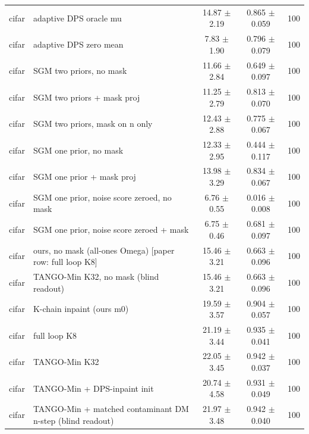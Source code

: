 \begin{tabular}{llccc}
cifar & adaptive DPS oracle mu & 14.87 $\pm$ 2.19 & 0.865 $\pm$ 0.059 & 100\\
cifar & adaptive DPS zero mean & 7.83 $\pm$ 1.90 & 0.796 $\pm$ 0.079 & 100\\
cifar & SGM two priors, no mask & 11.66 $\pm$ 2.84 & 0.649 $\pm$ 0.097 & 100\\
cifar & SGM two priors + mask proj & 11.25 $\pm$ 2.79 & 0.813 $\pm$ 0.070 & 100\\
cifar & SGM two priors, mask on n only & 12.43 $\pm$ 2.88 & 0.775 $\pm$ 0.067 & 100\\
cifar & SGM one prior, no mask & 12.33 $\pm$ 2.95 & 0.444 $\pm$ 0.117 & 100\\
cifar & SGM one prior + mask proj & 13.98 $\pm$ 3.29 & 0.834 $\pm$ 0.067 & 100\\
cifar & SGM one prior, noise score zeroed, no mask & 6.76 $\pm$ 0.55 & 0.016 $\pm$ 0.008 & 100\\
cifar & SGM one prior, noise score zeroed + mask & 6.75 $\pm$ 0.46 & 0.681 $\pm$ 0.097 & 100\\
cifar & ours, no mask (all-ones Omega) [paper row: full loop K8] & 15.46 $\pm$ 3.21 & 0.663 $\pm$ 0.096 & 100\\
cifar & TANGO-Min K32, no mask (blind readout) & 15.46 $\pm$ 3.21 & 0.663 $\pm$ 0.096 & 100\\
cifar & K-chain inpaint (ours m0) & 19.59 $\pm$ 3.57 & 0.904 $\pm$ 0.057 & 100\\
cifar & full loop K8 & 21.19 $\pm$ 3.44 & 0.935 $\pm$ 0.041 & 100\\
cifar & TANGO-Min K32 & 22.05 $\pm$ 3.45 & 0.942 $\pm$ 0.037 & 100\\
cifar & TANGO-Min + DPS-inpaint init & 20.74 $\pm$ 4.58 & 0.931 $\pm$ 0.049 & 100\\
cifar & TANGO-Min + matched contaminant DM n-step (blind readout) & 21.97 $\pm$ 3.48 & 0.942 $\pm$ 0.040 & 100\\
\bottomrule
\end{tabular}
